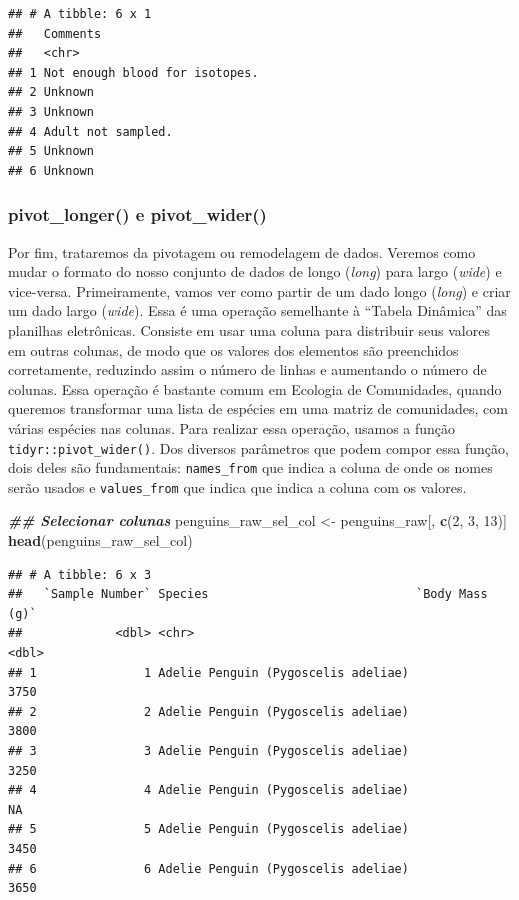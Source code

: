 \documentclass[
]{article}
\newenvironment{Shaded}{\begin{snugshade}}{\end{snugshade}}
\newcommand{\DecValTok}[1]{\textcolor[rgb]{0.00,0.00,0.81}{#1}}
\newcommand{\DocumentationTok}[1]{\textcolor[rgb]{0.56,0.35,0.01}{\textbf{\textit{#1}}}}
\newcommand{\FunctionTok}[1]{\textcolor[rgb]{0.13,0.29,0.53}{\textbf{#1}}}
\newcommand{\NormalTok}[1]{#1}
\newcommand{\OtherTok}[1]{\textcolor[rgb]{0.56,0.35,0.01}{#1}}
\begin{document}
\begin{verbatim}
## # A tibble: 6 x 1
##   Comments                      
##   <chr>                         
## 1 Not enough blood for isotopes.
## 2 Unknown                       
## 3 Unknown                       
## 4 Adult not sampled.            
## 5 Unknown                       
## 6 Unknown
\end{verbatim}

\hypertarget{pivot_longer-e-pivot_wider}{%
\subsubsection{pivot\_longer() e pivot\_wider()}\label{pivot_longer-e-pivot_wider}}

Por fim, trataremos da pivotagem ou remodelagem de dados. Veremos como mudar o formato do nosso conjunto de dados de longo (\emph{long}) para largo (\emph{wide}) e vice-versa. Primeiramente, vamos ver como partir de um dado longo (\emph{long}) e criar um dado largo (\emph{wide}). Essa é uma operação semelhante à ``Tabela Dinâmica'' das planilhas eletrônicas. Consiste em usar uma coluna para distribuir seus valores em outras colunas, de modo que os valores dos elementos são preenchidos corretamente, reduzindo assim o número de linhas e aumentando o número de colunas. Essa operação é bastante comum em Ecologia de Comunidades, quando queremos transformar uma lista de espécies em uma matriz de comunidades, com várias espécies nas colunas. Para realizar essa operação, usamos a função \texttt{tidyr::pivot\_wider()}. Dos diversos parâmetros que podem compor essa função, dois deles são fundamentais: \texttt{names\_from} que indica a coluna de onde os nomes serão usados e \texttt{values\_from} que indica que indica a coluna com os valores.

\begin{Shaded}
\begin{Highlighting}[]
\DocumentationTok{\#\# Selecionar colunas}
\NormalTok{penguins\_raw\_sel\_col }\OtherTok{\textless{}{-}}\NormalTok{ penguins\_raw[, }\FunctionTok{c}\NormalTok{(}\DecValTok{2}\NormalTok{, }\DecValTok{3}\NormalTok{, }\DecValTok{13}\NormalTok{)]}
\FunctionTok{head}\NormalTok{(penguins\_raw\_sel\_col)}
\end{Highlighting}
\end{Shaded}

\begin{verbatim}
## # A tibble: 6 x 3
##   `Sample Number` Species                             `Body Mass (g)`
##             <dbl> <chr>                                         <dbl>
## 1               1 Adelie Penguin (Pygoscelis adeliae)            3750
## 2               2 Adelie Penguin (Pygoscelis adeliae)            3800
## 3               3 Adelie Penguin (Pygoscelis adeliae)            3250
## 4               4 Adelie Penguin (Pygoscelis adeliae)              NA
## 5               5 Adelie Penguin (Pygoscelis adeliae)            3450
## 6               6 Adelie Penguin (Pygoscelis adeliae)            3650
\end{verbatim}
\end{document}

